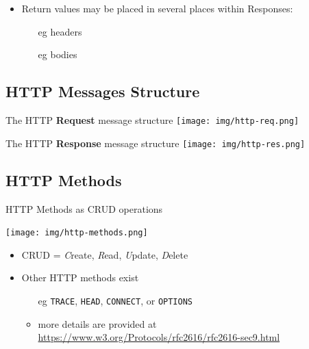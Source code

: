 \documentclass[presentation]{beamer}\mode<presentation>{\usetheme{AMSBolognaFC}}
\begin{document}
\begin{frame}[allowframebreaks]
\begin{itemize}
        \vspace{.3cm}

        \item \alert{Return values} may be placed in several places within \alert{Responses}:
        \begin{itemize}
            \item[eg] headers
            \item[eg] bodies
        \end{itemize}
    \end{itemize}

\end{frame}

\subsection{HTTP Messages Structure}

\begin{frame}{The HTTP \textbf{Request} message structure}
    \centering
    \texttt{[image: img/http-req.png]}
\end{frame}

\begin{frame}{The HTTP \textbf{Response} message structure}
    \centering
    \texttt{[image: img/http-res.png]}
\end{frame}

\subsection{HTTP Methods}

\begin{frame}{HTTP Methods as CRUD operations}
    \begin{center}
        \texttt{[image: img/http-methods.png]}
    \end{center}

    \vfill

    \begin{itemize}
        \item CRUD = \emph{C}reate, \emph{R}ead, \emph{U}pdate, \emph{D}elete

        \vfill

        \item Other HTTP methods exist
        \begin{itemize}
            \item[eg] \texttt{TRACE}, \texttt{HEAD}, \texttt{CONNECT}, or \texttt{OPTIONS}
            \item more details are provided at \url{https://www.w3.org/Protocols/rfc2616/rfc2616-sec9.html}
        \end{itemize}
    \end{itemize}
\end{frame}
\end{document}

